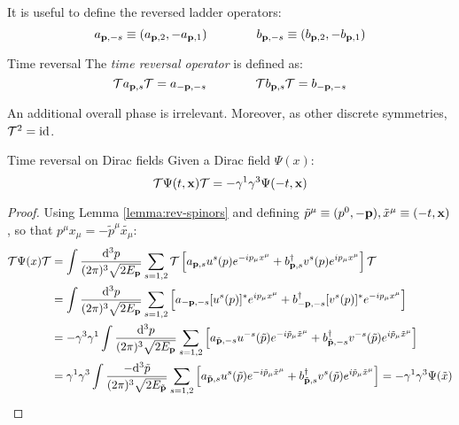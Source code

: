 It is useful to define the reversed ladder operators:
\begin{equation}
  a_{\mathbf{p},-s} \equiv (a_{\mathbf{p},2} , -a_{\mathbf{p},1})
  \qquad \qquad
  b_{\mathbf{p},-s} \equiv (b_{\mathbf{p},2} , -b_{\mathbf{p},1})
  \label{eq:2.39}
\end{equation}

\begin{definition}{Time reversal}{}
  The \textit{time reversal operator} is defined as:
  \begin{equation}
    \mathcal{T} a_{\mathbf{p},s} \mathcal{T} = a_{-\mathbf{p},-s}
    \qquad \qquad
    \mathcal{T} b_{\mathbf{p},s} \mathcal{T} = b_{-\mathbf{p},-s}
    \label{eq:2.40}
  \end{equation}
\end{definition}

An additional overall phase is irrelevant. Moreover, as other discrete symmetries, $ \mathcal{T}^2 = \operatorname{id} $.

\begin{proposition}{Time reversal on Dirac fields}{}
  Given a Dirac field $ \Psi(x) $:
  \begin{equation}
    \mathcal{T} \Psi(t,\mathbf{x}) \mathcal{T} = - \gamma^1 \gamma^3 \Psi(-t,\mathbf{x})
    \label{eq:2.41}
  \end{equation}

  \begin{proof}
    Using Lemma \ref{lemma:rev-spinors} and defining $ \tilde{p}^\mu \equiv (p^0,-\mathbf{p}) , \tilde{x}^\mu \equiv (-t,\mathbf{x}) $, so that $ p^\mu x_\mu = -\tilde{p}^\mu \tilde{x_\mu} $:
    \begin{equation*}
      \begin{split}
        \mathcal{T} \Psi(x) \mathcal{T}
        &= \int \frac{\mathrm{d}^3p}{(2\pi)^3 \sqrt{2E_{\mathbf{p}}}} \sum_{s = 1,2} \mathcal{T} \left[ a_{\mathbf{p},s} u^s(p) e^{-i p_\mu x^\mu} + b_{\mathbf{p},s}^\dagger v^s(p) e^{i p_\mu x^\mu} \right] \mathcal{T} \\
        &= \int \frac{\mathrm{d}^3p}{(2\pi)^3 \sqrt{2E_{\mathbf{p}}}} \sum_{s = 1,2} \left[ a_{-\mathbf{p},-s} [u^s(p)]^* e^{i p_\mu x^\mu} + b_{-\mathbf{p},-s}^\dagger [v^s(p)]^* e^{-i p_\mu x^\mu} \right] \\
        &= - \gamma^3 \gamma^1 \int \frac{\mathrm{d}^3p}{(2\pi)^3 \sqrt{2E_{\mathbf{p}}}} \sum_{s = 1,2} \left[ a_{\tilde{\mathbf{p}},-s} u^{-s}(\tilde{p}) e^{-i \tilde{p}_\mu \tilde{x}^\mu} + b_{\tilde{\mathbf{p}},-s}^\dagger v^{-s}(\tilde{p}) e^{i \tilde{p}_\mu \tilde{x}^\mu} \right] \\
        &= \gamma^1 \gamma^3 \int \frac{-\mathrm{d}^3\tilde{p}}{(2\pi)^3 \sqrt{2E_{\tilde{\mathbf{p}}}}} \sum_{s = 1,2} \left[ a_{\tilde{\mathbf{p}},s} u^s(\tilde{p}) e^{-i \tilde{p}_\mu \tilde{x}^\mu} + b_{\tilde{\mathbf{p}},s}^\dagger v^s(\tilde{p}) e^{i \tilde{p}_\mu \tilde{x}^\mu} \right]
        = - \gamma^1 \gamma^3 \Psi(\tilde{x})
      \end{split}
    \end{equation*}
  \end{proof}
 \end{proposition}

